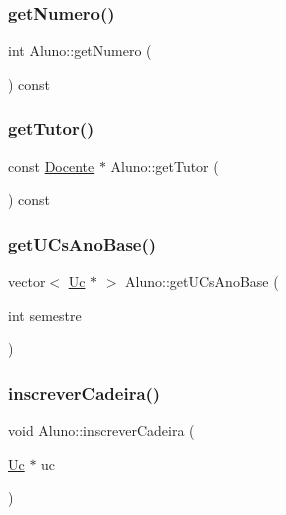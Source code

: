 \hypertarget{class_aluno_afcbe89f392d4c6332bcbd17184ad50bb}{}\label{class_aluno_afcbe89f392d4c6332bcbd17184ad50bb} 
\subsubsection{\texorpdfstring{get\+Numero()}{getNumero()}}
{\footnotesize\ttfamily int Aluno\+::get\+Numero (\begin{DoxyParamCaption}{ }\end{DoxyParamCaption}) const}

\hypertarget{class_aluno_a26e3da1324ccda24ba0f73bd39d2ea63}{}\label{class_aluno_a26e3da1324ccda24ba0f73bd39d2ea63} 
\subsubsection{\texorpdfstring{get\+Tutor()}{getTutor()}}
{\footnotesize\ttfamily const \hyperlink{class_docente}{Docente} $\ast$ Aluno\+::get\+Tutor (\begin{DoxyParamCaption}{ }\end{DoxyParamCaption}) const}

\hypertarget{class_aluno_a3bcc5d9133d8f034ef862c596b07c2ec}{}\label{class_aluno_a3bcc5d9133d8f034ef862c596b07c2ec} 
\subsubsection{\texorpdfstring{get\+U\+Cs\+Ano\+Base()}{getUCsAnoBase()}}
{\footnotesize\ttfamily vector$<$ \hyperlink{class_uc}{Uc} $\ast$ $>$ Aluno\+::get\+U\+Cs\+Ano\+Base (\begin{DoxyParamCaption}\item[{int}]{semestre }\end{DoxyParamCaption})}

\hypertarget{class_aluno_ac4010eebc776c72f5575b4ea8b230209}{}\label{class_aluno_ac4010eebc776c72f5575b4ea8b230209} 
\subsubsection{\texorpdfstring{inscrever\+Cadeira()}{inscreverCadeira()}}
{\footnotesize\ttfamily void Aluno\+::inscrever\+Cadeira (\begin{DoxyParamCaption}\item[{\hyperlink{class_uc}{Uc} $\ast$}]{uc }\end{DoxyParamCaption})}

